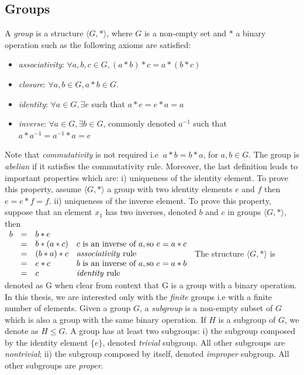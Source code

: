 \subsection{Groups}
A \emph{group} is a structure $\langle G, * \rangle$, where $G$ is a non-empty set and $*$ a binary
operation such as the following axioms are satisfied:
\begin{itemize}[noitemsep,nolistsep]
 \item \emph{associativity}: $\forall a, b, c \in G, (a * b) * c = a * (b * c)$
 \item \emph{closure}: $\forall a, b \in G, a * b \in G$.
 \item \emph{identity}: $\forall a \in G, \exists e$ such that $ a * e = e * a = a$
 \item \emph{inverse}:  $\forall a \in G, \exists b \in G$, commonly denoted $a^{-1}$ such that
 $a * a^{-1} = a^{-1} * a = e$
\end{itemize}
Note that \emph{commutativity} is not required i.e $\ a * b = b * a$, for $a, b \in G$.
The group is \emph{abelian} if it satisfies the commutativity rule.
Moreover, the last definition leads to important properties which are: i) uniqueness of the identity element. 
To prove this property, assume $\langle G, * \rangle$ a group with two identity elements $e$ and $f$ 
then $ e = e * f = f$.
ii) uniqueness of the inverse element. To prove this property, suppose that an element $x_1$ has two inverses,
denoted $b$ and $c$ in groups $\langle G, * \rangle$, then\\
 $\begin{array}{lcll}     
b & = & b * e & \\
& = & b * (a * c) & c \text{ is an inverse of } a, \text{so } e = a * c\\
& = & (b * a) * c &   \text{\emph{associativity} rule}\\
& = & e * c       & b \text{ is an inverse of } a, \text{so } e = a * b\\
& = & c           &   \text{\emph{identity} rule}
\end{array}$
The structure $\langle G, * \rangle$ is denoted as G when clear from context that G is a group
with a binary operation. In this thesis, we are interested only with the \emph{finite} groups i.e
with a finite number of elements.
Given a group $G$, a \emph{subgroup} is a non-empty subset of $G$ which is also a group with 
the same binary operation. If $H$ is a subgroup of $G$, we denote as $H \leq G$.
A group has at least two subgroups: i) the subgroup composed by the identity element $\{e\}$, denoted \emph{trivial} subgroup.
All other subgroups are \emph{nontrivial}; ii) the subgroup composed by itself,
denoted \emph{improper} subgroup. All other subgroups are \emph{proper}.

